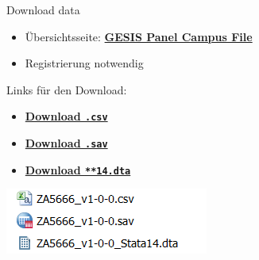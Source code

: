\documentclass[ignorenonframetext,]{beamer}
\providecommand{\tightlist}{%
  \setlength{\itemsep}{0pt}\setlength{\parskip}{0pt}}
\begin{document}
\begin{frame}[fragile]{Download data}

\begin{itemize}
\tightlist
\item
  Übersichtsseite:
  \href{https://www.gesis.org/gesis-panel/data/}{\textbf{GESIS Panel
  Campus File}}
\item
  Registrierung notwendig
\end{itemize}

\begin{block}{Links für den Download:}

\begin{itemize}
\tightlist
\item
  \href{https://dbk.gesis.org/dbksearch/download.asp?db=D\&id=62367}{\textbf{Download
  \texttt{.csv}}}
\item
  \href{https://dbk.gesis.org/dbksearch/download.asp?db=D\&id=62369}{\textbf{Download
  \texttt{.sav}}}
\item
  \href{https://dbk.gesis.org/dbksearch/download.asp?db=D\&id=62371}{\textbf{Download
  \texttt{**14.dta}}}
\end{itemize}

\includegraphics{figure/filenamesGP2.PNG}

\end{block}

\end{frame}
\end{document}
